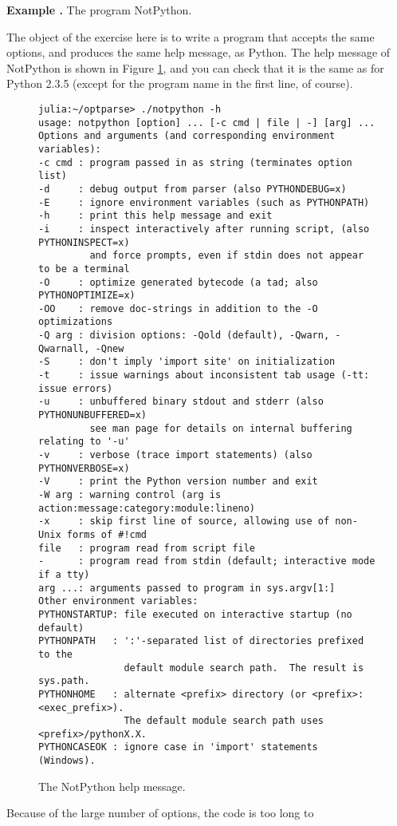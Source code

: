 \documentclass{article}
\newcounter{exnum}
\newenvironment{example}[1]
{\par\smallskip\noindent\refstepcounter{exnum}\textbf{Example
    \theexnum.} The program #1.\par\nopagebreak}
{\par\smallskip}
\begin{document}
\begin{example}{NotPython}\label{ex:notpython}
  The object of the exercise here is to write a program that accepts
  the same options, and produces the same help message, as Python. The
  help message of NotPython is shown in Figure \ref{fig:notpy-help},
  and you can check that it is the same as for Python 2.3.5 (except
  for the program name in the first line, of course). 
  \begin{figure}\small
\begin{verbatim}
julia:~/optparse> ./notpython -h
usage: notpython [option] ... [-c cmd | file | -] [arg] ...
Options and arguments (and corresponding environment variables):
-c cmd : program passed in as string (terminates option list)
-d     : debug output from parser (also PYTHONDEBUG=x)
-E     : ignore environment variables (such as PYTHONPATH)
-h     : print this help message and exit
-i     : inspect interactively after running script, (also PYTHONINSPECT=x)
         and force prompts, even if stdin does not appear to be a terminal
-O     : optimize generated bytecode (a tad; also PYTHONOPTIMIZE=x)
-OO    : remove doc-strings in addition to the -O optimizations
-Q arg : division options: -Qold (default), -Qwarn, -Qwarnall, -Qnew
-S     : don't imply 'import site' on initialization
-t     : issue warnings about inconsistent tab usage (-tt: issue errors)
-u     : unbuffered binary stdout and stderr (also PYTHONUNBUFFERED=x)
         see man page for details on internal buffering relating to '-u'
-v     : verbose (trace import statements) (also PYTHONVERBOSE=x)
-V     : print the Python version number and exit
-W arg : warning control (arg is action:message:category:module:lineno)
-x     : skip first line of source, allowing use of non-Unix forms of #!cmd
file   : program read from script file
-      : program read from stdin (default; interactive mode if a tty)
arg ...: arguments passed to program in sys.argv[1:]
Other environment variables:
PYTHONSTARTUP: file executed on interactive startup (no default)
PYTHONPATH   : ':'-separated list of directories prefixed to the
               default module search path.  The result is sys.path.
PYTHONHOME   : alternate <prefix> directory (or <prefix>:<exec_prefix>).
               The default module search path uses <prefix>/pythonX.X.
PYTHONCASEOK : ignore case in 'import' statements (Windows).
\end{verbatim}
    \caption{The NotPython help message.}
    \label{fig:notpy-help}
  \end{figure}
  Because of the large number of options, the code is too long to

\end{example}
\end{document}
